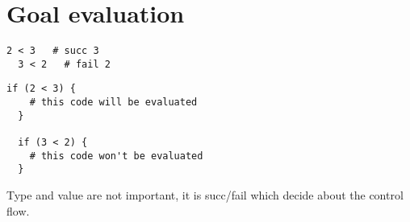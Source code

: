 \chapter{Goal evaluation}

\begin{example}[Comparation]
\begin{lstlisting}[language=intentio]
  2 < 3   # succ 3
  3 < 2   # fail 2
\end{lstlisting}
\end{example}

\begin{example}
\begin{lstlisting}[language=intentio,mathescape=true]
  if (2 < 3) {
    # this code will be evaluated
  }

  if (3 < 2) {
    # this code won't be evaluated
  }
\end{lstlisting}
\end{example}

Type and value are not important, it is succ/fail which decide about the control flow.
